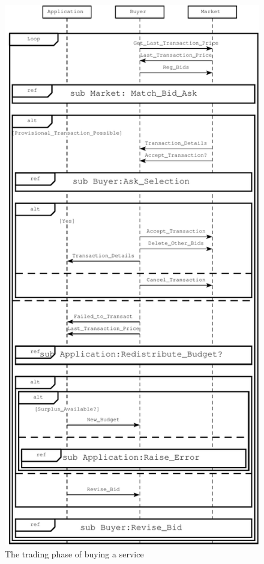 \documentclass[10pt,journal,compsoc]{IEEEtran}
\begin{document}
\begin{figure}[h]
\centering
\includegraphics[scale=0.8]{drawings/trading_phase.pdf}
\caption{The trading phase of buying a service \label{fig:trading_phase}}
\end{figure}
\end{document}
